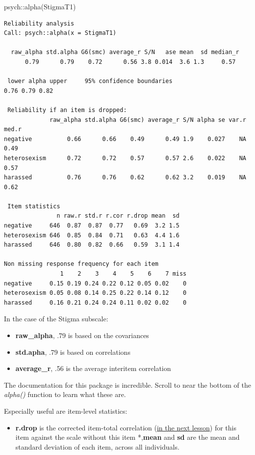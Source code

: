 \documentclass[
  english,
]{book}
\newenvironment{Shaded}{\begin{snugshade}}{\end{snugshade}}
\newcommand{\FunctionTok}[1]{\textcolor[rgb]{0.00,0.00,0.00}{#1}}
\newcommand{\NormalTok}[1]{#1}
\newcommand{\SpecialCharTok}[1]{\textcolor[rgb]{0.00,0.00,0.00}{#1}}
\providecommand{\tightlist}{%
  \setlength{\itemsep}{0pt}\setlength{\parskip}{0pt}}
\begin{document}
\begin{Shaded}
\begin{Highlighting}[]
\NormalTok{psych}\SpecialCharTok{::}\FunctionTok{alpha}\NormalTok{(StigmaT1)}
\end{Highlighting}
\end{Shaded}

\begin{verbatim}
Reliability analysis   
Call: psych::alpha(x = StigmaT1)

  raw_alpha std.alpha G6(smc) average_r S/N   ase mean  sd median_r
      0.79      0.79    0.72      0.56 3.8 0.014  3.6 1.3     0.57

 lower alpha upper     95% confidence boundaries
0.76 0.79 0.82 

 Reliability if an item is dropped:
             raw_alpha std.alpha G6(smc) average_r S/N alpha se var.r med.r
negative          0.66      0.66    0.49      0.49 1.9    0.027    NA  0.49
heterosexism      0.72      0.72    0.57      0.57 2.6    0.022    NA  0.57
harassed          0.76      0.76    0.62      0.62 3.2    0.019    NA  0.62

 Item statistics 
               n raw.r std.r r.cor r.drop mean  sd
negative     646  0.87  0.87  0.77   0.69  3.2 1.5
heterosexism 646  0.85  0.84  0.71   0.63  4.4 1.6
harassed     646  0.80  0.82  0.66   0.59  3.1 1.4

Non missing response frequency for each item
                1    2    3    4    5    6    7 miss
negative     0.15 0.19 0.24 0.22 0.12 0.05 0.02    0
heterosexism 0.05 0.08 0.14 0.25 0.22 0.14 0.12    0
harassed     0.16 0.21 0.24 0.24 0.11 0.02 0.02    0
\end{verbatim}

In the case of the Stigma subscale:

\begin{itemize}
\tightlist
\item
  \textbf{raw\_alpha}, .79 is based on the covariances
\item
  \textbf{std.apha}, .79 is based on correlations
\item
  \textbf{average\_r}, .56 is the average interitem correlation
\end{itemize}

The documentation for this package is incredible. Scroll to near the bottom of the \emph{alpha()} function to learn what these are.

Especially useful are item-level statistics:

\begin{itemize}
\tightlist
\item
  \textbf{r.drop} is the corrected item-total correlation (\protect\hyperlink{ItemAnalSurvey}{in the next lesson}) for this item against the scale without this item
  *,\textbf{mean} and \textbf{sd} are the mean and standard deviation of each item, across all individuals.
\end{itemize}
\end{document}
